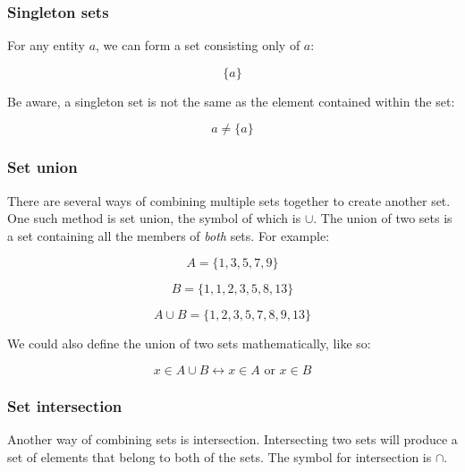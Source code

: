 
\subsubsection{Singleton sets}

For any entity $a$, we can form a set consisting only of $a$:

\begin{dmath*}
	\{a\}
\end{dmath*}

Be aware, a singleton set is not the same as the element contained within the
set:

\begin{dmath*}
	a \neq \{a\}
\end{dmath*}

\subsubsection{Set union}

There are several ways of combining multiple sets together to create another
set. One such method is set union, the symbol of which is $\cup$. The union of
two sets is a set containing all the members of {\it both} sets. For example:

\begin{dmath*}
	A = \{1, 3, 5, 7, 9\}
\end{dmath*}

\begin{dmath*}
 	B = \{1, 1, 2, 3, 5, 8, 13\}
\end{dmath*}

\begin{dmath*}
	A \cup B = \{1, 2, 3, 5, 7, 8, 9, 13\}
\end{dmath*}

We could also define the union of two sets mathematically, like so:

\begin{dmath*}
	{x \in A \cup B \leftrightarrow x \in A \textrm{ or } x \in B}
\end{dmath*}

\subsubsection{Set intersection}

Another way of combining sets is intersection. Intersecting two sets will
produce a set of elements that belong to both of the sets. The symbol for
intersection is $\cap$.

